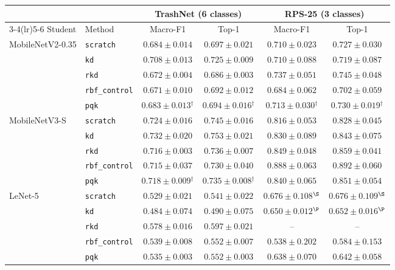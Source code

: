 \begin{tabular}{@{}llcccc@{}}
\toprule
 & & \multicolumn{2}{c}{TrashNet (6 classes)} & \multicolumn{2}{c}{RPS-25 (3 classes)} \\
\cmidrule(lr){3-4}\cmidrule(lr){5-6}
Student & Method & Macro-F1 & Top-1 & Macro-F1 & Top-1 \\
\midrule
MobileNetV2-0.35 & \texttt{scratch} & $0.684\pm0.014$ & $0.697\pm0.021$ & $0.710\pm0.023$ & $0.727\pm0.030$ \\
 & \texttt{kd} & $\mathbf{0.708}\pm0.013$ & $\mathbf{0.725}\pm0.009$ & $0.710\pm0.088$ & $0.719\pm0.087$ \\
 & \texttt{rkd} & $0.672\pm0.004$ & $0.686\pm0.003$ & $\mathbf{0.737}\pm0.051$ & $\mathbf{0.745}\pm0.048$ \\
 & \texttt{rbf\_control} & $0.671\pm0.010$ & $0.692\pm0.012$ & $0.684\pm0.062$ & $0.702\pm0.059$ \\
 & \texttt{pqk} & $0.683\pm0.013$$^{\dagger}$ & $0.694\pm0.016$$^{\dagger}$ & $0.713\pm0.030$$^{\dagger}$ & $0.730\pm0.019$$^{\dagger}$ \\
\midrule
MobileNetV3-S & \texttt{scratch} & $0.724\pm0.016$ & $0.745\pm0.016$ & $0.816\pm0.053$ & $0.828\pm0.045$ \\
 & \texttt{kd} & $\mathbf{0.732}\pm0.020$ & $\mathbf{0.753}\pm0.021$ & $0.830\pm0.089$ & $0.843\pm0.075$ \\
 & \texttt{rkd} & $0.716\pm0.003$ & $0.736\pm0.007$ & $0.849\pm0.048$ & $0.859\pm0.041$ \\
 & \texttt{rbf\_control} & $0.715\pm0.037$ & $0.730\pm0.040$ & $\mathbf{0.888}\pm0.063$ & $\mathbf{0.892}\pm0.060$ \\
 & \texttt{pqk} & $0.718\pm0.009$$^{\dagger}$ & $0.735\pm0.008$$^{\dagger}$ & $0.840\pm0.065$ & $0.851\pm0.054$ \\
\midrule
LeNet-5 & \texttt{scratch} & $0.529\pm0.021$ & $0.541\pm0.022$ & $\mathbf{0.676}\pm0.108$$^{\S}$ & $\mathbf{0.676}\pm0.109$$^{\S}$ \\
 & \texttt{kd} & $0.484\pm0.074$ & $0.490\pm0.075$ & $0.650\pm0.012$$^{\P}$ & $0.652\pm0.016$$^{\P}$ \\
 & \texttt{rkd} & $\mathbf{0.578}\pm0.016$ & $\mathbf{0.597}\pm0.021$ & -- & -- \\
 & \texttt{rbf\_control} & $0.539\pm0.008$ & $0.552\pm0.007$ & $0.538\pm0.202$ & $0.584\pm0.153$ \\
 & \texttt{pqk} & $0.535\pm0.003$ & $0.552\pm0.003$ & $0.638\pm0.070$ & $0.642\pm0.058$ \\
\bottomrule
\end{tabular}
